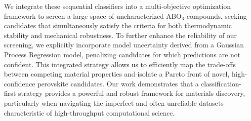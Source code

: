 \documentclass[]{article}
\begin{document}
We integrate these sequential classifiers into a multi-objective optimization framework to screen a large space of uncharacterized ABO$_3$ compounds, seeking candidates that simultaneously satisfy the criteria for both thermodynamic stability and mechanical robustness. To further enhance the reliability of our screening, we explicitly incorporate model uncertainty derived from a Gaussian Process Regression model, penalizing candidates for which predictions are not confident. This integrated strategy allows us to efficiently map the trade-offs between competing material properties and isolate a Pareto front of novel, high-confidence perovskite candidates. Our work demonstrates that a classification-first strategy provides a powerful and robust framework for materials discovery, particularly when navigating the imperfect and often unreliable datasets characteristic of high-throughput computational science.
\end{document}

